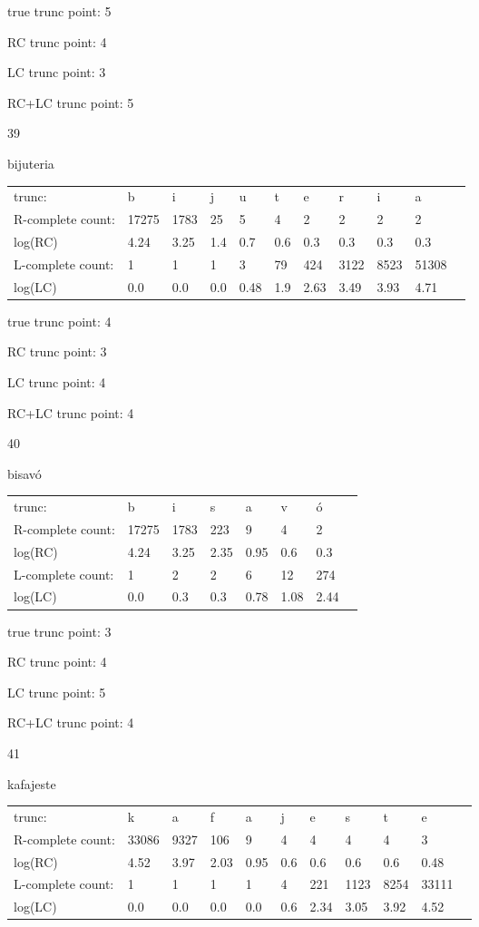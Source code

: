 \documentclass{article}
\begin{document}
true trunc point: 5

RC trunc point: 4

LC trunc point: 3

RC+LC trunc point: 5

\vspace{1em}

39

bijuteria

\begin{tabular}{l|llllllllll}
trunc: & b & i & j & u & t & e & r & i & a & \\ 
R-complete count: & 17275 & 1783 & 25 & 5 & 4 & 2 & 2 & 2 & 2 & \\ 
log(RC) & 4.24 & 3.25 & 1.4 & 0.7 & 0.6 & 0.3 & 0.3 & 0.3 & 0.3 & \\ 
L-complete count: & 1 & 1 & 1 & 3 & 79 & 424 & 3122 & 8523 & 51308 & \\ 
log(LC) & 0.0 & 0.0 & 0.0 & 0.48 & 1.9 & 2.63 & 3.49 & 3.93 & 4.71 & \\ 
\end{tabular}

true trunc point: 4

RC trunc point: 3

LC trunc point: 4

RC+LC trunc point: 4

\vspace{1em}

40

bisavó

\begin{tabular}{l|lllllll}
trunc: & b & i & s & a & v & ó & \\ 
R-complete count: & 17275 & 1783 & 223 & 9 & 4 & 2 & \\ 
log(RC) & 4.24 & 3.25 & 2.35 & 0.95 & 0.6 & 0.3 & \\ 
L-complete count: & 1 & 2 & 2 & 6 & 12 & 274 & \\ 
log(LC) & 0.0 & 0.3 & 0.3 & 0.78 & 1.08 & 2.44 & \\ 
\end{tabular}

true trunc point: 3

RC trunc point: 4

LC trunc point: 5

RC+LC trunc point: 4

\newpage

41

kafajeste

\begin{tabular}{l|llllllllll}
trunc: & k & a & f & a & j & e & s & t & e & \\ 
R-complete count: & 33086 & 9327 & 106 & 9 & 4 & 4 & 4 & 4 & 3 & \\ 
log(RC) & 4.52 & 3.97 & 2.03 & 0.95 & 0.6 & 0.6 & 0.6 & 0.6 & 0.48 & \\ 
L-complete count: & 1 & 1 & 1 & 1 & 4 & 221 & 1123 & 8254 & 33111 & \\ 
log(LC) & 0.0 & 0.0 & 0.0 & 0.0 & 0.6 & 2.34 & 3.05 & 3.92 & 4.52 & \\ 
\end{tabular}
\end{document}
